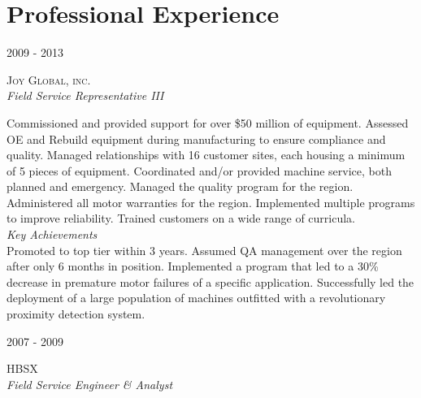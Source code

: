 \documentclass[11pt]{article} %
\begin{document}
\begin{minipage}[t]{0.5\textwidth} %
\vspace{0pt} %
	

\section{Professional Experience} 


{\raggedleft\textsc{2009 - 2013}\par}

{\raggedright\large\textsc{Joy Global, inc.}\\
\textit{Field Service Representative III}\\[5pt]}

\normalsize{Commissioned and provided support for over \$50 million of equipment. Assessed OE and Rebuild equipment during manufacturing to ensure compliance and quality. Managed relationships with 16 customer sites, each housing a minimum of 5 pieces of equipment. Coordinated and/or provided machine service, both planned and emergency. Managed the quality program for the region. Administered all motor warranties for the region. Implemented multiple programs to improve reliability. Trained customers on a wide range of curricula.}\\

\textit{\color{headings}Key Achievements}\\
\normalsize{Promoted to top tier within 3 years. Assumed QA management over the region after only 6 months in position. Implemented a program that led to a 30\% decrease in premature motor failures of a specific application. Successfully led the deployment of a large population of machines outfitted with a revolutionary proximity detection system.}


{\raggedleft\textsc{2007 - 2009}\par}

{\raggedright\large\textsc{HBSX}\\
\textit{Field Service Engineer \& Analyst}\\[5pt]}


\end{minipage}
\end{document}
